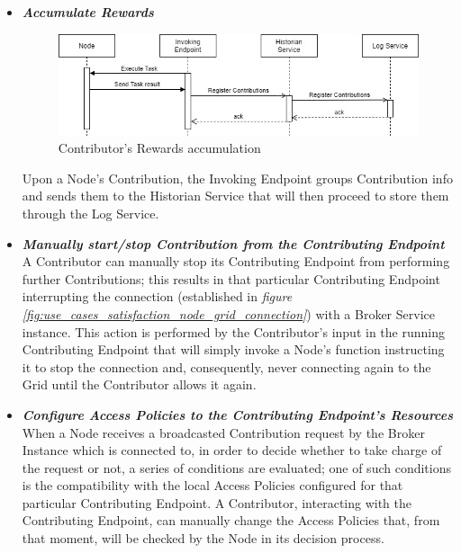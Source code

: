\begin{itemize}
    \begin{itemize}
        \item \textbf{\textit{Accumulate Rewards}}\\
        \begin{figure}[!ht]
            \centering
            \includegraphics[scale=0.6]{document/chapters/chapter_5/images/use_cases_satisfaction_rewards_accumulation.jpg}
            \caption{Contributor's Rewards accumulation}
            \label{fig:use_cases_satisfaction_rewards_accumulation}
        \end{figure}

        Upon a Node's Contribution, the Invoking Endpoint groups Contribution info and sends them to the Historian Service that will then proceed to store them through the Log Service.

        \item \textbf{\textit{Manually start/stop Contribution from the Contributing Endpoint}}\\
        A Contributor can manually stop its Contributing Endpoint from performing further Contributions; this results in that particular Contributing Endpoint interrupting the connection (established in \textit{figure \ref{fig:use_cases_satisfaction_node_grid_connection}}) with a Broker Service instance.
        This action is performed by the Contributor's input in the running Contributing Endpoint that will simply invoke a Node's function instructing it to stop the connection and, consequently, never connecting again to the Grid until the Contributor allows it again.

        \item \textbf{\textit{Configure Access Policies to the Contributing Endpoint's Resources}}\\
        When a Node receives a broadcasted Contribution request by the Broker Instance which is connected to, in order to decide whether to take charge of the request or not, a series of conditions are evaluated; one of such conditions is the compatibility with the local Access Policies configured for that particular Contributing Endpoint. 
        A Contributor, interacting with the Contributing Endpoint, can manually change the Access Policies that, from that moment, will be checked by the Node in its decision process. 


\end{itemize}
\end{itemize}
